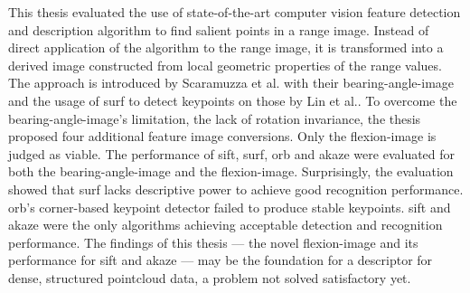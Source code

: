 This thesis evaluated the use of state-of-the-art computer vision feature detection and description algorithm to find salient points in a range image.
Instead of direct application of the algorithm to the range image, it is transformed into a derived image constructed from local geometric properties of the range values.
The approach is introduced by Scaramuzza et al.\cite{scaramuzza_iros2007} with their \gls{bearing-angle-image} and the usage of \acrshort{surf} to detect keypoints on those by Lin et al.\cite{lin_easp2017}.
To overcome the \gls{bearing-angle-image}'s limitation, the lack of rotation invariance, the thesis proposed four additional feature image conversions.
Only the \gls{flexion-image} is judged as viable.
The performance of \acrshort{sift}, \acrshort{surf}, \acrshort{orb} and \acrshort{akaze} were evaluated for both the \gls{bearing-angle-image} and the \gls{flexion-image}.
Surprisingly, the evaluation showed that \acrshort{surf} lacks descriptive power to achieve good recognition performance.
\acrshort{orb}'s corner-based keypoint detector failed to produce stable keypoints.
\acrshort{sift} and \acrshort{akaze} were the only algorithms achieving acceptable detection and recognition performance.
The findings of this thesis --- the novel \gls{flexion-image} and its performance for \acrshort{sift} and \acrshort{akaze} --- may be the foundation for a descriptor for dense, structured pointcloud data, a problem not solved satisfactory yet.
